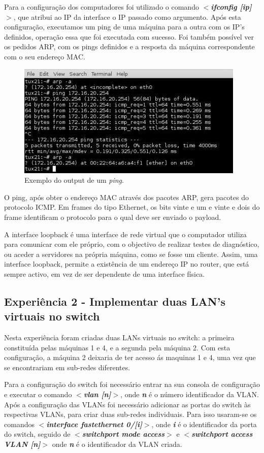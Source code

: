 \documentclass[a4paper]{article}
\begin{document}
Para a configuração dos computadores foi utilizado o comando \textbf{\textit{$<$ifconfig [ip]$>$}}, que atribui ao IP da interface o IP passado como argumento. Após esta configuração, executamos um ping de uma máquina para a outra com os IP’s definidos, operação essa que foi executada com sucesso. Foi também possível ver os pedidos ARP, com os pings definidos e a resposta da máquina correspondente com o seu endereço MAC.

\begin{figure}[h!]
\centering
\includegraphics[scale=0.5]{res/image1.jpg}
\caption{Exemplo do output de um \emph{ping}.}
\end{figure}

O ping, após obter o endereço MAC através dos pacotes ARP, gera pacotes do protocolo ICMP. Em frames do tipo Ethernet, os bits vinte e um e vinte e dois do frame identificam o protocolo para o qual deve ser enviado o payload.

\pagebreak

A interface loopback é uma interface de rede virtual que o computador utiliza para comunicar com ele próprio, com o objectivo de realizar testes de diagnóstico, ou aceder a servidores na própria máquina, como se fosse um cliente. Assim, uma interface loopback, permite a existência de um endereço IP no router, que está sempre activo, em vez de ser dependente de uma interface física.

\subsection{Experiência 2 - Implementar duas LAN's virtuais no switch}
Nesta experiência foram criadas duas LANs virtuais no switch: a primeira constituída pelas máquinas 1 e 4, e a segunda pela máquina 2. Com esta configuração, a máquina 2 deixaria de ter acesso ás maquinas 1 e 4, uma vez que se encontrariam em sub-redes diferentes.

Para a configuração do switch foi necessário entrar na sua consola de configuração e executar o comando \textbf{\textit{$<$vlan [n]$>$}}, onde \textbf{\textit{n}} é o número identificador da VLAN. Após a configuração das VLANs foi necessário adicionar as portas do switch às respectivas VLANs, para criar duas sub-redes individuais. Para isso usaram-se os comandos \textbf{\textit{$<$interface fastethernet 0/[i]$>$}}, onde \textbf{\textit{i}} é o identificador da porta do switch, seguido de \textbf{\textit{$<$switchport mode access$>$}} e \textbf{\textit{$<$switchport access VLAN [n]$>$}} onde \textit{\textbf{n}} é o identificador da VLAN criada.
\end{document}
